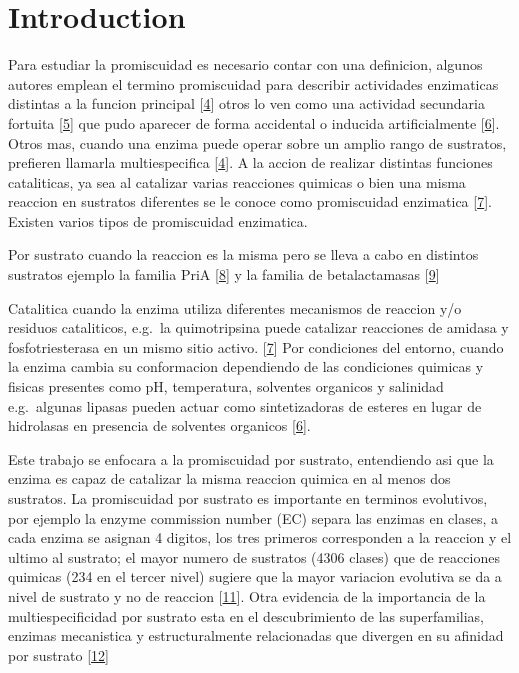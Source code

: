 \documentclass[12pt,twoside]{reedthesis}
\begin{document}
  \section{Introduction}\label{introduction}
  
  Para estudiar la promiscuidad es necesario contar con una definicion,
  algunos autores emplean el termino promiscuidad para describir
  actividades enzimaticas distintas a la funcion principal
  {[}\protect\hyperlink{ref-khersonskyux5fenzymeux5f2010}{4}{]} otros lo
  ven como una actividad secundaria fortuita
  {[}\protect\hyperlink{ref-copleyux5fenzymesux5f2003}{5}{]} que pudo
  aparecer de forma accidental o inducida artificialmente
  {[}\protect\hyperlink{ref-hultux5fenzymeux5f2007}{6}{]}. Otros mas,
  cuando una enzima puede operar sobre un amplio rango de sustratos,
  prefieren llamarla multiespecifica
  {[}\protect\hyperlink{ref-khersonskyux5fenzymeux5f2010}{4}{]}. A la
  accion de realizar distintas funciones cataliticas, ya sea al catalizar
  varias reacciones quimicas o bien una misma reaccion en sustratos
  diferentes se le conoce como promiscuidad enzimatica
  {[}\protect\hyperlink{ref-obrienux5fcatalyticux5f1999}{7}{]}. Existen
  varios tipos de promiscuidad enzimatica.
  
  Por sustrato cuando la reaccion es la misma pero se lleva a cabo en
  distintos sustratos ejemplo la familia PriA
  {[}\protect\hyperlink{ref-baronagomezux5foccurrenceux5f2003}{8}{]} y la
  familia de betalactamasas
  {[}\protect\hyperlink{ref-rissoux5fphenotypicux5f2014}{9}{]}
  
  Catalitica cuando la enzima utiliza diferentes mecanismos de reaccion
  y/o residuos cataliticos, e.g.~la quimotripsina puede catalizar
  reacciones de amidasa y fosfotriesterasa en un mismo sitio activo.
  {[}\protect\hyperlink{ref-obrienux5fcatalyticux5f1999}{7}{]} Por
  condiciones del entorno, cuando la enzima cambia su conformacion
  dependiendo de las condiciones quimicas y fisicas presentes como pH,
  temperatura, solventes organicos y salinidad e.g.~algunas lipasas pueden
  actuar como sintetizadoras de esteres en lugar de hidrolasas en
  presencia de solventes organicos
  {[}\protect\hyperlink{ref-hultux5fenzymeux5f2007}{6}{]}.
  
  Este trabajo se enfocara a la promiscuidad por sustrato, entendiendo asi
  que la enzima es capaz de catalizar la misma reaccion quimica en al
  menos dos sustratos. La promiscuidad por sustrato es importante en
  terminos evolutivos, por ejemplo la enzyme commission number (EC) separa
  las enzimas en clases, a cada enzima se asignan 4 digitos, los tres
  primeros corresponden a la reaccion y el ultimo al sustrato; el mayor
  numero de sustratos (4306 clases) que de reacciones quimicas (234 en el
  tercer nivel) sugiere que la mayor variacion evolutiva se da a nivel de
  sustrato y no de reaccion
  {[}\protect\hyperlink{ref-liux5fcomputationalux5f2004}{11}{]}. Otra
  evidencia de la importancia de la multiespecificidad por sustrato esta
  en el descubrimiento de las superfamilias, enzimas mecanistica y
  estructuralmente relacionadas que divergen en su afinidad por sustrato
  {[}\protect\hyperlink{ref-glasnerux5fevolutionux5f2006}{12}{]}
  
\end{document}

